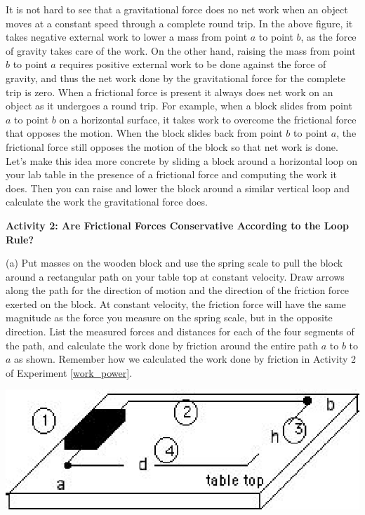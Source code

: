 It is not hard to see that a gravitational force does no net work when an object
moves at a constant speed through a complete round trip. In the above figure,
it takes negative external work to lower a mass from point $a$ to point $b$, as
the force of gravity takes care of the work. On the other hand, raising the
mass from point $b$ to point $a$ requires positive external work to be done against the force of gravity, and thus the net work done by the gravitational force
for the complete trip is zero. When a frictional force is present it always
does net work on an object as it undergoes a round trip. For example, when a
block slides from point $a$ to point $b$ on a horizontal surface, it takes work
to overcome the frictional force that opposes the motion. When the block slides
back from point $b$ to point $a$, the frictional force still opposes the motion
of the block so that net work is done. Let's make this idea more concrete by
sliding a block around a horizontal loop on your lab table in the presence of
a frictional force and computing the work it does. Then you can raise and lower
the block around a similar vertical loop and calculate the work the gravitational force does.

\bigskip
\textbf{Activity 2: Are Frictional Forces Conservative According to the Loop
Rule?} 

(a) Put masses on the wooden block and use the spring scale to pull the block
around a rectangular path on your table top at constant velocity. Draw arrows
along the path for the direction of motion and the direction of the friction force exerted on the block. At constant velocity, the friction force will have the same magnitude as the force you measure on the spring scale, but in the opposite direction. List the measured forces and distances for each of the four segments of the path, and calculate the work done by friction around the entire path $a$ to $b$ to $a$ as shown. Remember how we calculated the work done by friction in Activity 2 of  Experiment \ref{work_power}.

\vspace{0.3cm}
{\par\raggedright \includegraphics{conservative/conservative_fig3.eps} \par}
\vspace{0.3cm}

